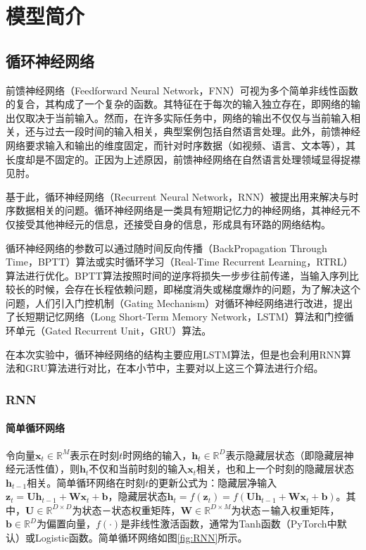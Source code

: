 \section{模型简介}\label{sec:2}

\subsection{循环神经网络}

前馈神经网络（Feedforward Neural Network，FNN）可视为多个简单非线性函数的复合，其构成了一个复杂的函数。其特征在于每次的输入独立存在，即网络的输出仅取决于当前输入。然而，在许多实际任务中，网络的输出不仅仅与当前输入相关，还与过去一段时间的输入相关，典型案例包括自然语言处理。此外，前馈神经网络要求输入和输出的维度固定，而针对时序数据（如视频、语言、文本等），其长度却是不固定的。正因为上述原因，前馈神经网络在自然语言处理领域显得捉襟见肘。

基于此，循环神经网络（Recurrent Neural Network，RNN）被提出用来解决与时序数据相关的问题。循环神经网络是一类具有短期记忆力的神经网络，其神经元不仅接受其他神经元的信息，还接受自身的信息，形成具有环路的网络结构。

循环神经网络的参数可以通过随时间反向传播（BackPropagation Through Time，BPTT）算法\cite{BPTT}或实时循环学习（Real-Time Recurrent Learning，RTRL）算法\cite{RTRL}进行优化。BPTT算法按照时间的逆序将损失一步步往前传递，当输入序列比较长的时候，会存在长程依赖问题，即梯度消失或梯度爆炸的问题，为了解决这个问题，人们引入门控机制（Gating Mechanism）对循环神经网络进行改进，提出了长短期记忆网络（Long Short-Term Memory Network，LSTM）算法\cite{lstm}和门控循环单元（Gated Recurrent Unit，GRU）算法\cite{GRU}。

在本次实验中，循环神经网络的结构主要应用LSTM算法，但是也会利用RNN算法和GRU算法进行对比，在本小节中，主要对以上这三个算法进行介绍。

\subsubsection{RNN}

\paragraph{简单循环网络}

令向量$\boldsymbol     {x}_t \in \mathbb{R}^M$表示在时刻$t$时网络的输入，$\boldsymbol     {h}_t \in \mathbb{R}^D$表示隐藏层状态（即隐藏层神经元活性值），则$\boldsymbol     {h}_t$不仅和当前时刻的输入$\boldsymbol     {x}_t$相关，也和上一个时刻的隐藏层状态$\boldsymbol     {h}_{t-1}$相关。简单循环网络在时刻$t$的更新公式为：隐藏层净输入$\boldsymbol      z_{t}=\boldsymbol      U\boldsymbol     {h}_{t-1}+\boldsymbol      W\boldsymbol     {x}_{t}+\boldsymbol     {b}$，隐藏层状态$\boldsymbol      h_t=f(\boldsymbol      z_t)=f(\boldsymbol      U\boldsymbol     {h}_{t-1}+\boldsymbol      W\boldsymbol     {x}_{t}+\boldsymbol     {b})$。其中，$\boldsymbol      U \in \mathbb{R}^{D \times D}$为状态－状态权重矩阵，$\boldsymbol     {W} \in \mathbb{R}^{D \times M}$为状态－输入权重矩阵，$\boldsymbol     {b} \in \mathbb{R}^D$为偏置向量，$f(\cdot)$是非线性激活函数，通常为Tanh函数（PyTorch中默认）或Logistic函数。简单循环网络如图\ref{fig:RNN}所示。

